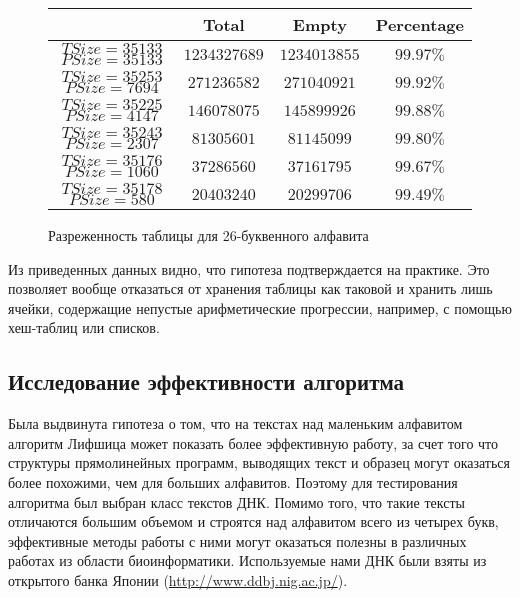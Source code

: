 \documentclass[14pt]{article}
\begin{document}
\begin{figure}[h]
    \begin{center}
    \begin{tabular}{ | c | c | c | c |}
        \hline
            & Total & Empty & Percentage \\
        \hline
        $T Size = 35133$ $P Size = 35133$ & $1234327689$ & $1234013855$ & $99.97\%$\\
        \hline
        $T Size = 35253$ $P Size = 7694$ & $271236582$ & $271040921$ & $99.92\%$\\
        \hline
        $T Size = 35225$ $P Size = 4147$ & $146078075$ & $145899926$ & $99.88\%$\\
        \hline
        $T Size = 35243$ $P Size = 2307$ & $81305601$ & $81145099$ & $99.80\%$\\
        \hline
        $T Size = 35176$ $P Size = 1060$ & $37286560$ & $37161795$ & $99.67\%$\\
        \hline
        $T Size = 35178$ $P Size = 580$ & $20403240$ & $20299706$ & $99.49\%$\\
        \hline
    \end{tabular}
    \end{center}
    \caption{Разреженность таблицы для 26-буквенного алфавита}
    \label{26_letter_emptyness}
\end{figure}

Из приведенных данных видно, что гипотеза подтверждается на практике.
Это позволяет вообще отказаться от хранения таблицы как таковой и хранить лишь ячейки, содержащие непустые арифметические прогрессии, например, с помощью хеш-таблиц или списков.

\subsection{Исследование эффективности алгоритма}

Была выдвинута гипотеза о том, что на текстах над маленьким алфавитом алгоритм Лифшица может показать более эффективную работу, за счет того что структуры прямолинейных программ, выводящих текст и образец могут оказаться более похожими, чем для больших алфавитов. Поэтому для тестирования алгоритма был выбран класс текстов ДНК. Помимо того, что такие тексты отличаются большим объемом и строятся над алфавитом всего из четырех букв, эффективные методы работы с ними могут оказаться полезны в различных работах из области биоинформатики.
Используемые нами ДНК были взяты из открытого банка Японии (\url{http://www.ddbj.nig.ac.jp/}).
\end{document}
